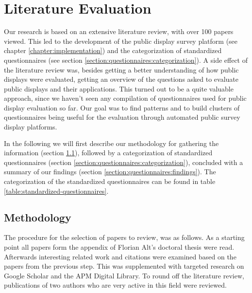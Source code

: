 \section{Literature Evaluation}
\label{chapter:literature-evaluation}

	Our research is based on an extensive literature review, with over 100 papers viewed. This led to the development of the public display survey platform (see chapter \ref{chapter:implementation}) and the categorization of standardized questionnaires (see section \ref{section:questionnaires:categorization}). A side effect of the literature review was, besides getting a better understanding of how public displays were evaluated, getting an overview of the questions asked to evaluate public displays and their applications. This turned out to be a quite valuable approach, since we haven't seen any compilation of questionnaires used for public display evaluation so far. Our goal was to find patterns and to build clusters of questionnaires being useful for the evaluation through automated public survey display platforms.

	In the following we will first describe our methodology for gathering the information (section \ref{section:questionnaires:methodology}), followed by a categorization of standardized questionnaires (section \ref{section:questionnaires:categorization}), concluded with a summary of our findings (section \ref{section:questionnaires:findings}). The categorization of the standardized questionnaires can be found in table \ref{table:standardized-questionnaires}.



\subsection{Methodology}
\label{section:questionnaires:methodology}

	The procedure for the selection of papers to review, was as follows. As a starting point all papers form the appendix of Florian Alt's doctoral thesis \cite{alt2013thesis} were read. Afterwards interesting related work and citations were examined based on the papers from the previous step. This was supplemented with targeted research on Google Scholar and the APM Digital Library. To round off the literature review, publications of two authors who are very active in this field were reviewed. 

